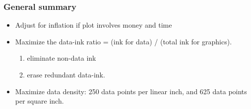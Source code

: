 \begin{frame}\frametitle{General summary}
	\begin{itemize}
		\item	Adjust for inflation if plot involves money and time 
		\item	Maximize the data-ink ratio = (ink for data) / (total ink for graphics). 
		\begin{enumerate}
			\item	eliminate non-data ink 
			\item	erase redundant data-ink. 
		\end{enumerate}
		\item	Maximize data density: 250 data points per linear inch, and 625 data points per square inch. 
	\end{itemize}
\end{frame}